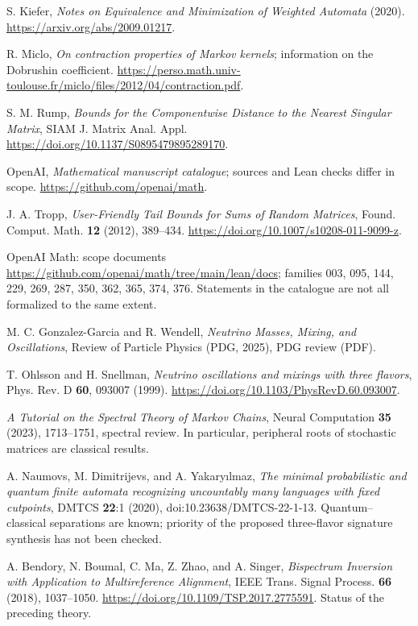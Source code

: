 \documentclass[11pt,a4paper,oneside]{book}
\begin{document}
\begin{enumerate}[label={[\arabic*]},leftmargin=*,itemsep=7pt]
\item S. Kiefer, \emph{Notes on Equivalence and Minimization of Weighted Automata} (2020). \url{https://arxiv.org/abs/2009.01217}.
\item R. Miclo, \emph{On contraction properties of Markov kernels}; information on the Dobrushin coefficient. \url{https://perso.math.univ-toulouse.fr/miclo/files/2012/04/contraction.pdf}.
\item S. M. Rump, \emph{Bounds for the Componentwise Distance to the Nearest Singular Matrix}, SIAM J. Matrix Anal. Appl. \url{https://doi.org/10.1137/S0895479895289170}.
\item OpenAI, \emph{Mathematical manuscript catalogue}; sources and Lean checks differ in scope. \url{https://github.com/openai/math}.
\item J. A. Tropp, \emph{User-Friendly Tail Bounds for Sums of Random Matrices}, Found. Comput. Math. \textbf{12} (2012), 389--434. \url{https://doi.org/10.1007/s10208-011-9099-z}.
\item OpenAI Math: scope documents \url{https://github.com/openai/math/tree/main/lean/docs}; families 003, 095, 144, 229, 269, 287, 350, 362, 365, 374, 376. Statements in the catalogue are not all formalized to the same extent.
\item M. C. Gonzalez-Garcia and R. Wendell, \emph{Neutrino Masses, Mixing, and Oscillations}, Review of Particle Physics (PDG, 2025), PDG review (PDF).
\item T. Ohlsson and H. Snellman, \emph{Neutrino oscillations and mixings with three flavors}, Phys. Rev. D \textbf{60}, 093007 (1999). \url{https://doi.org/10.1103/PhysRevD.60.093007}.
\item \emph{A Tutorial on the Spectral Theory of Markov Chains}, Neural Computation \textbf{35} (2023), 1713--1751, spectral review. In particular, peripheral roots of stochastic matrices are classical results.
\item A. Naumovs, M. Dimitrijevs, and A. Yakary\i lmaz, \emph{The minimal probabilistic and quantum finite automata recognizing uncountably many languages with fixed cutpoints}, DMTCS \textbf{22}:1 (2020), doi:10.23638/DMTCS-22-1-13. Quantum--classical separations are known; priority of the proposed three-flavor signature synthesis has not been checked.
\item A. Bendory, N. Boumal, C. Ma, Z. Zhao, and A. Singer, \emph{Bispectrum Inversion with Application to Multireference Alignment}, IEEE Trans. Signal Process. \textbf{66} (2018), 1037--1050. \url{https://doi.org/10.1109/TSP.2017.2775591}. Status of the preceding theory.

\end{enumerate}
\end{document}
